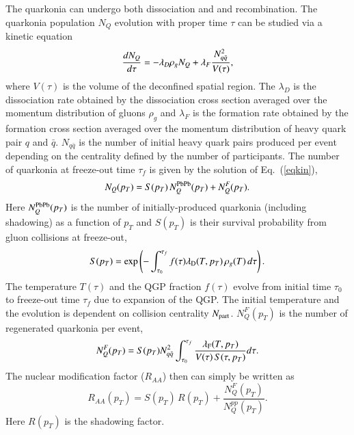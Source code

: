 {\color{black}
  The quarkonia can undergo both dissociation and and recombination.
 The quarkonia population $N_{Q}$ evolution with proper time $\tau$ can be studied via
a kinetic equation~\cite{Thews:2000rj}
  \begin{equation}\label{eqkin}
    {dN_{Q} \over d\tau}  =  - \lambda_D  \rho_g N_{Q} + \lambda_F {N_{q \bar{q}}^{2} \over V(\tau)},
  \end{equation}
  where $V(\tau)$ is the volume of the deconfined spatial region.
The $\lambda_{D}$ is the dissociation rate obtained by the dissociation cross section averaged over 
the momentum distribution of gluons $\rho_g$ and $\lambda_{F}$ is the formation
rate obtained by the formation cross section 
averaged over the momentum distribution of heavy quark pair $q$ and $\bar{q}$. 
$N_{q \bar{q}}$ is the number of initial heavy quark pairs produced per event depending on the
centrality defined by the number of participants.
  The number of quarkonia at freeze-out time $\tau_f$ is given by the solution of Eq.~(\ref{eqkin}),
  \begin{equation}
    N_{Q}(p_T) = S(p_T) \,N_{Q}^{\rm PbPb}(p_T)+N_{Q}^F(p_T).
    \label{eqbeta}
  \end{equation}
  Here $N_{Q}^{\rm PbPb}(p_T)$ is the number of initially-produced quarkonia (including shadowing)
  as a function of $p_T$ and $S(p_T)$ is their survival probability from gluon collisions at freeze-out, 
  \begin{equation}
    S(p_T) = \exp \left( {-\int_{\tau_0}^{\tau_f}f(\tau) \lambda_{\rm D}(T,p_T)\,\rho_g(T)\,d\tau} \right).
  \end{equation}
  The temperature $T(\tau)$ and the QGP fraction $f(\tau)$ evolve from initial time $\tau_0$ 
  to freeze-out time $\tau_f$ due to expansion of the QGP. The initial temperature and the 
  evolution is dependent on collision centrality $N_{\rm part}$.
  $N_{Q}^F(p_T)$ is the number of regenerated quarkonia per event,
  \begin{equation}
    N_{Q}^F(p_T)=S(p_T)N_{q \bar{q}}^{2} \int_{\tau_0}^{\tau_f}{{\lambda_{\mathrm{F}}(T,p_T) \over V(\tau)\,S(\tau,p_T)} d\tau}.
  \end{equation}
  The nuclear modification factor ($R_{AA}$) then can simply be written as~\cite{Kumar:2014kfa, Kumar:2019xdj}
  \begin{equation}
    R_{AA}(p_T)=S(p_T) \, R(p_T) + \frac{N_{Q}^F(p_T)}{N_{Q}^{pp}(p_T)}.
    \label{raa}
  \end{equation}
  Here $R(p_T)$ is the shadowing factor.

}
